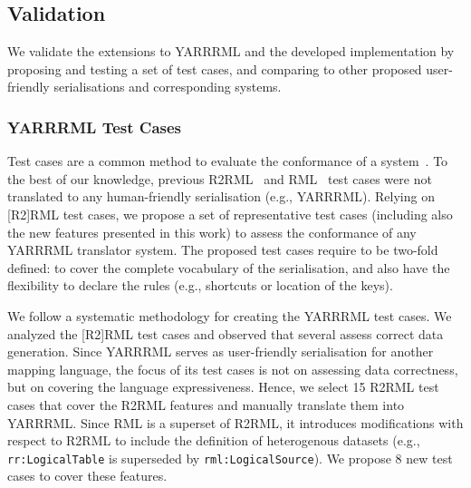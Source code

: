 \subsection{Validation}
\label{sec:chp5_yarrrml-validation}
We validate the extensions to YARRRML and the developed implementation by 
proposing and testing a set of test cases, and comparing to other proposed user-friendly serialisations and corresponding systems.

\subsubsection{YARRRML Test Cases} %
Test cases are a common method to evaluate the conformance of a system~\citep{arenas2023morphstar,heyvaert2019conformance}. 
To the best of our knowledge, previous R2RML~\citep{boris2012r2rml} and RML~\citep{heyvaert2019conformance} test cases were not translated to any human-friendly serialisation (e.g., YARRRML).
Relying on [R2]RML test cases, we propose a set of representative test cases (including also the new features presented in this work) to assess the conformance of any YARRRML translator system.
The proposed test cases require to be two-fold defined: to cover the complete vocabulary of the serialisation, and also have the flexibility to declare the rules (e.g., shortcuts or location of the keys). 

We follow a systematic methodology for creating the YARRRML test cases. 
We analyzed the [R2]RML test cases and observed that several assess correct data generation.
Since YARRRML serves as user-friendly serialisation for another mapping language, the focus of its test cases is not on assessing data correctness, but on covering the language expressiveness.
Hence, we select 15 R2RML test cases that cover the R2RML features and manually translate them into YARRRML. 
Since RML is a superset of R2RML, it introduces modifications with respect to R2RML to include the definition of heterogenous datasets (e.g., \texttt{rr:LogicalTable} is superseded by \texttt{rml:LogicalSource}). %
We propose 8 new test cases to cover these features. 


